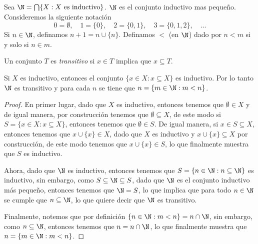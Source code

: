 Sea $\N = \bigcap\{X : X \ \text{es inductivo}\}$. $\N$ es el conjunto inductivo mas pequeño. Consideremos la siguiente notación
\[
  0 = \emptyset,\quad
  1 = \{0\},\quad
  2 = \{0,1\},\quad
  3 = \{0,1,2\},\quad
  \ldots
\]
Si $n \in \N$, definamos $n+1 = n \cup \{n\}$. Definamos $<$ (en $\N$) dado por $n < m$ si y solo si $n \in m$.

Un conjunto $T$ es \emph{transitivo} si $x \in T$ implica que $x \subseteq T$.

\begin{exercise}[1.3]
  Si $X$ es inductivo, entonces el conjunto $\{x \in X : x \subseteq X\}$ es inductivo. Por lo tanto $\N$ es transitivo y para cada $n$ se tiene que $n = \{m \in \N : m<n\}$.
\end{exercise}
\begin{proof}
  En primer lugar, dado que $X$ es inductivo, entonces tenemos que $\emptyset \in X$ y de igual manera, por construcción tenemos que $\emptyset \subseteq X$, de este modo si $S = \{ x \in X : x \subseteq X\}$, entonces tenemos que $\emptyset \in S$. De igual manera, si $x \in S \subseteq X$, entonces tenemos que $x \cup \{x\} \in X$, dado que $X$ es inductivo y $x \cup \{x\} \subseteq X$ por construcción, de este modo tenemos que $x\cup\{x\} \in S$, lo que finalmente muestra que $S$ es inductivo.

  Ahora, dado que $\N$ es inductivo, entonces tenemos que $S = \{n \in \N : n \subseteq \N\}$ es inductivo, sin embargo, como $S \subseteq \N \subseteq S$, dado que $\N$ es el conjunto inductivo más pequeño, entonces tenemos que $\N = S$, lo que implica que para todo $n \in \N$ se cumple que $n \subseteq \N$, lo que quiere decir que $\N$ es transitivo.

  Finalmente, notemos que por definición $\{n \in \N : m < n\} = n \cap \N$, sin embargo, como $n \subseteq \N$, entonces tenemos que $n = n \cap \N$, lo que finalmente muestra que $n = \{m \in \N: m<n\}$.
\end{proof}